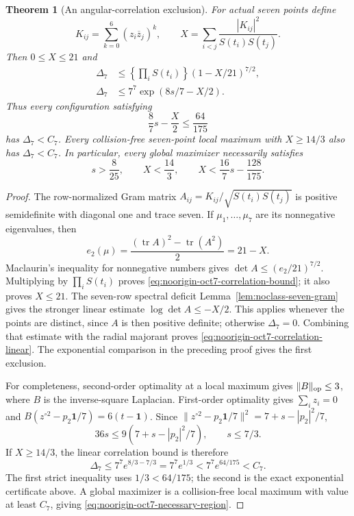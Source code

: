 \documentclass[11pt]{article}
\newtheorem{theorem}{Theorem}[section]
\theoremstyle{remark}
\numberwithin{equation}{section}
\begin{document}
\begin{theorem}[An angular-correlation exclusion]
\label{thm:noorigin-oct7-correlations}
For actual seven points define
\[
 K_{ij}=\sum_{k=0}^6(z_i\overline z_j)^k,\qquad
 X=\sum_{i<j}\frac{|K_{ij}|^2}{S(t_i)S(t_j)}.
\]
Then $0\le X\le21$ and
\begin{align}
 \Delta_7&\le\left\{\prod_iS(t_i)\right\}
                    (1-X/21)^{7/2},
                    \label{eq:noorigin-oct7-correlation-bound}\\
 \Delta_7&\le7^7\exp(8s/7-X/2).
                    \label{eq:noorigin-oct7-correlation-linear}
\end{align}
Thus every configuration satisfying
\[
                      \frac87s-\frac X2\le\frac{64}{175}
\]
has $\Delta_7<C_7$. Every collision-free seven-point local maximum
with $X\ge14/3$ also has $\Delta_7<C_7$.
In particular, every global maximizer necessarily satisfies
\begin{equation}\label{eq:noorigin-oct7-necessary-region}
 s>\frac8{25},\qquad
 X<\frac{14}{3},\qquad
 X<\frac{16}{7}s-\frac{128}{175}.
\end{equation}
\end{theorem}
\begin{proof}
The row-normalized Gram matrix $A_{ij}=K_{ij}/\sqrt{S(t_i)S(t_j)}$
is positive semidefinite with diagonal one and trace seven.
If $\mu_1,\ldots,\mu_7$ are its nonnegative eigenvalues, then
\[
 e_2(\mu)=\frac{(\operatorname{tr}A)^2-\operatorname{tr}(A^2)}2
        =21-X.
\]
Maclaurin's inequality for nonnegative numbers gives
$\det A\le(e_2/21)^{7/2}$. Multiplying by $\prod_iS(t_i)$
proves \eqref{eq:noorigin-oct7-correlation-bound}; it also proves
$X\le21$. The seven-row spectral deficit
Lemma~\ref{lem:noclass-seven-gram} gives the stronger linear
estimate $\log\det A\le-X/2$. This applies whenever the points
are distinct, since $A$ is then positive definite; otherwise
$\Delta_7=0$. Combining that estimate with the radial majorant proves
\eqref{eq:noorigin-oct7-correlation-linear}. The exponential
comparison in the preceding proof gives the first exclusion.

For completeness, second-order optimality at a local maximum gives
$\|B\|_{\rm op}\le3$, where $B$ is the inverse-square Laplacian.
First-order optimality gives $\sum_i z_i=0$ and
$B(z^{\circ2}-p_2\mathbf1/7)=6(t-\mathbf1)$.
Since $\|z^{\circ2}-p_2\mathbf1/7\|^2=7+s-|p_2|^2/7$,
\[
             36s\le9(7+s-|p_2|^2/7),\qquad s\le7/3.
\]
If $X\ge14/3$, the linear correlation bound is therefore
\[
             \Delta_7\le7^7e^{8/3-7/3}
                 =7^7e^{1/3}<7^7e^{64/175}<C_7.
\]
The first strict inequality uses $1/3<64/175$; the second is
the exact exponential certificate above. A global maximizer is a
collision-free local maximum
with value at least $C_7$, giving
\eqref{eq:noorigin-oct7-necessary-region}.
\end{proof}
\end{document}
